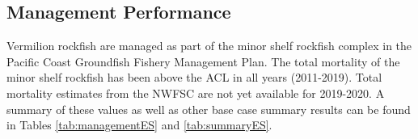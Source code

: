 \documentclass[11pt,
  english,
  a4paper,
]{article}
\begin{document}
\FloatBarrier


\hypertarget{management-performance}{%
\subsection*{Management Performance}\label{management-performance}}

\leavevmode\tagmcend\tagstructend

Vermilion rockfish are managed as part of the minor shelf rockfish complex in the Pacific Coast Groundfish Fishery Management Plan. The total mortality of the minor shelf rockfish has been above the ACL in all years (2011-2019). Total mortality estimates from the NWFSC are not yet available for 2019-2020. A summary of these values as well as other base case summary results can be found in Tables \ref{tab:managementES} and \ref{tab:summaryES}.
\end{document}
